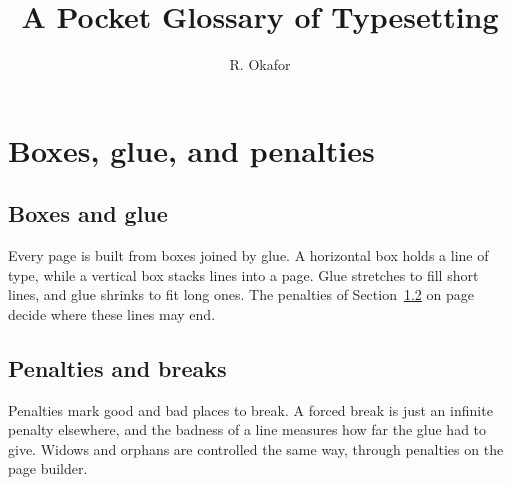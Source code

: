 \documentclass[11pt,openany]{book}
\title{A Pocket Glossary of Typesetting}
\author{R. Okafor}
\date{}
\begin{document}
\maketitle

\chapter{Boxes, glue, and penalties}
\label{ch:main}

\section{Boxes and glue}

Every page is built from boxes joined by
glue. A horizontal box holds a line of
type, while a vertical box stacks lines into a page.
Glue stretches to fill short lines, and
glue shrinks to fit long ones. The penalties of
Section~\ref{sec:breaks} on page~\pageref{sec:breaks} decide where these
lines may end.

\section{Penalties and breaks}
\label{sec:breaks}

Penalties mark good and bad places to break. A forced break
is just an infinite penalty elsewhere, and the
badness of a line measures how far the glue had to give.
Widows and orphans are controlled the same way,
through penalties on the page builder.

\printindex
\end{document}
